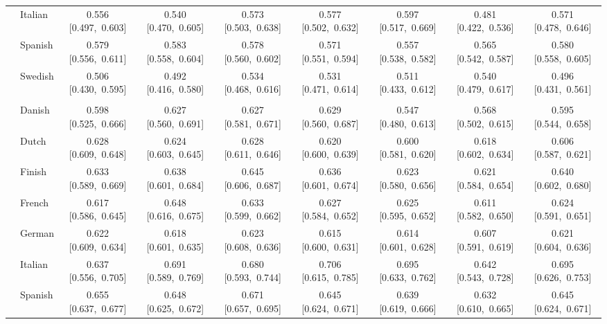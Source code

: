 \begin{longtable}[t]{llccccccc}
 & Italian & 0.556 [0.497,~0.603] & 0.540 [0.470,~0.605] & 0.573 [0.503,~0.638] & 0.577 [0.502,~0.632] & 0.597 [0.517,~0.669] & 0.481 [0.422,~0.536] & 0.571 [0.478,~0.646]\\

 & Spanish & 0.579 [0.556,~0.611] & 0.583 [0.558,~0.604] & 0.578 [0.560,~0.602] & 0.571 [0.551,~0.594] & 0.557 [0.538,~0.582] & 0.565 [0.542,~0.587] & 0.580 [0.558,~0.605]\\

 & Swedish & 0.506 [0.430,~0.595] & 0.492 [0.416,~0.580] & 0.534 [0.468,~0.616] & 0.531 [0.471,~0.614] & 0.511 [0.433,~0.612] & 0.540 [0.479,~0.617] & 0.496 [0.431,~0.561]\\

\addlinespace[3pt]
\multicolumn{9}{p{\linewidth}}{\cellcolor[HTML]{DCDCDC}{classify the stance expressed in quasi-sentence}}\\
\addlinespace & Danish & 0.598 [0.525,~0.666] & 0.627 [0.560,~0.691] & 0.627 [0.581,~0.671] & 0.629 [0.560,~0.687] & 0.547 [0.480,~0.613] & 0.568 [0.502,~0.615] & 0.595 [0.544,~0.658]\\

 & Dutch & 0.628 [0.609,~0.648] & 0.624 [0.603,~0.645] & 0.628 [0.611,~0.646] & 0.620 [0.600,~0.639] & 0.600 [0.581,~0.620] & 0.618 [0.602,~0.634] & 0.606 [0.587,~0.621]\\

 & Finish & 0.633 [0.589,~0.669] & 0.638 [0.601,~0.684] & 0.645 [0.606,~0.687] & 0.636 [0.601,~0.674] & 0.623 [0.580,~0.656] & 0.621 [0.584,~0.654] & 0.640 [0.602,~0.680]\\

 & French & 0.617 [0.586,~0.645] & 0.648 [0.616,~0.675] & 0.633 [0.599,~0.662] & 0.627 [0.584,~0.652] & 0.625 [0.595,~0.652] & 0.611 [0.582,~0.650] & 0.624 [0.591,~0.651]\\

 & German & 0.622 [0.609,~0.634] & 0.618 [0.601,~0.635] & 0.623 [0.608,~0.636] & 0.615 [0.600,~0.631] & 0.614 [0.601,~0.628] & 0.607 [0.591,~0.619] & 0.621 [0.604,~0.636]\\

 & Italian & 0.637 [0.556,~0.705] & 0.691 [0.589,~0.769] & 0.680 [0.593,~0.744] & 0.706 [0.615,~0.785] & 0.695 [0.633,~0.762] & 0.642 [0.543,~0.728] & 0.695 [0.626,~0.753]\\

 & Spanish & 0.655 [0.637,~0.677] & 0.648 [0.625,~0.672] & 0.671 [0.657,~0.695] & 0.645 [0.624,~0.671] & 0.639 [0.619,~0.666] & 0.632 [0.610,~0.665] & 0.645 [0.624,~0.671]\\


\end{longtable}
